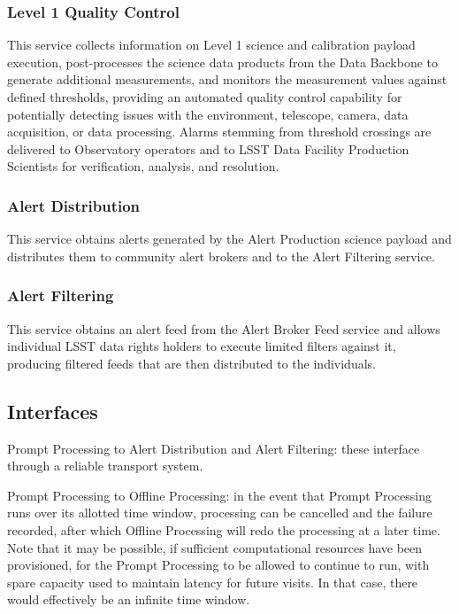 \documentclass[DM,toc]{lsstdoc}
\begin{document}
\subsubsection{Level 1 Quality Control}\label{level-1-quality-control}

This service collects information on Level 1 science and calibration
payload execution, post-processes the science data products from the
Data Backbone to generate additional measurements, and monitors the
measurement values against defined thresholds, providing an automated
quality control capability for potentially detecting issues with the
environment, telescope, camera, data acquisition, or data processing.
Alarms stemming from threshold crossings are delivered to Observatory
operators and to LSST Data Facility Production Scientists for
verification, analysis, and resolution.

\subsubsection{Alert Distribution}\label{alert-distribution}

This service obtains alerts generated by the Alert Production science
payload and distributes them to community alert brokers and to the Alert
Filtering service.

\subsubsection{Alert Filtering}\label{alert-filtering}

This service obtains an alert feed from the Alert Broker Feed service
and allows individual LSST data rights holders to execute limited
filters against it, producing filtered feeds that are then distributed
to the individuals.

\subsection{Interfaces}\label{ncsa-l1-interfaces}

Prompt Processing to Alert Distribution and Alert Filtering: these
interface through a reliable transport system.

Prompt Processing to Offline Processing: in the event that Prompt
Processing runs over its allotted time window, processing can be
cancelled and the failure recorded, after which Offline Processing will
redo the processing at a later time. Note that it may be possible, if
sufficient computational resources have been provisioned, for the Prompt
Processing to be allowed to continue to run, with spare capacity used to
maintain latency for future visits. In that case, there would
effectively be an infinite time window.
\end{document}
